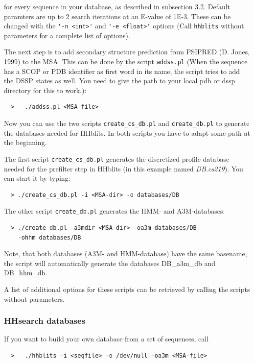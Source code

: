\documentclass[11pt,a4paper]{article}
\begin{document}
for every sequence in your database, as described in subsection 3.2. Default paramters 
are up to 2 search iterations at an E-value of 1E-3. These can be changed with the 
\verb`'-n <int>'` and \verb`'-e <float>'` options (Call \verb`hhblits` without parameters for a 
complete list of options). 

The next step is to add secondary structure prediction from PSIPRED (D. Jones, 1999) to the
MSA. This can be done by the script \verb`addss.pl` (When the sequence has a SCOP or PDB identifier as first word 
in its name, the script tries to add the DSSP states as well. You need to give the 
path to your local pdb or dssp directory for this to work.):

\begin{verbatim}
  >   ./addss.pl <MSA-file>
\end{verbatim}

Now you can use the two scripts \verb`create_cs_db.pl` and \verb`create_db.pl` to generate the
databases needed for HHblits. In both scripts you have to adapt some path at the beginning.

The first script \verb`create_cs_db.pl` generates the discretized profile database needed for the 
prefilter step in HHblits (in this example named {\it DB.cs219}). You can start it by typing:

\begin{verbatim}
  > ./create_cs_db.pl -i <MSA-dir> -o databases/DB
\end{verbatim}


The other script \verb`create_db.pl` generates the HMM- and A3M-databases:

\begin{verbatim}
  > ./create_db.pl -a3mdir <MSA-dir> -oa3m databases/DB
    -ohhm databases/DB
\end{verbatim}

Note, that both databases (A3M- and HMM-database) have the same basename, the script will
automatically generate the databases DB\_a3m\_db and DB\_hhm\_db.

A list of additional options for these scripts can be retrieved by calling the scripts without 
parameters.

\subsubsection{HHsearch databases}

If you want to build your own database from a set of sequences, call 
\begin{verbatim}
  >   ./hhblits -i <seqfile> -o /dev/null -oa3m <MSA-file>
\end{verbatim}
\end{document}
